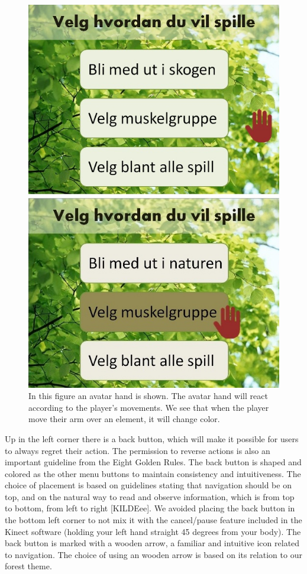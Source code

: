 \begin{figure} [H]
\centering
\includegraphics[scale=0.5]{menuAvatarAction.jpg}
\caption[Menu - Action and response]{In this figure an avatar hand is shown. The avatar hand will react according to the player's movements. We see that when the player move their arm over an element, it will change color.}
\label{fig:avatarAction}
\end{figure} 

Up in the left corner there is a back button, which will make it possible for users to always regret their action. The permission to reverse actions is also an important guideline from the Eight Golden Rules. The back button is shaped and colored as the other menu buttons to maintain consistency and intuitiveness. The choice of placement is based on guidelines stating that navigation should be on top, and on the natural way to read and observe information, which is from top to bottom, from left to right [KILDEee]. We avoided placing the back button in the bottom left corner to not mix it with the cancel/pause feature included in the Kinect software (holding your left hand straight 45 degrees from your body). The back button is marked with a wooden arrow, a familiar and intuitive icon related to navigation. The choice of using an wooden arrow is based on its relation to our forest theme. 

